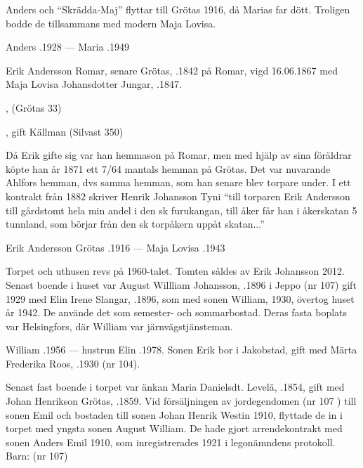 Anders och ``Skrädda-Maj'' flyttar till Grötas 1916, då Marias far dött. Troligen bodde de tillsammans med modern Maja Lovisa.

Anders .1928  ---  Maria .1949


Erik Andersson Romar, senare Grötas, .1842 på Romar, vigd 16.06.1867 med Maja Lovisa Johansdotter Jungar, .1847.
\begin{jhchildren}
  \item {}, (Grötas 33)
  \item {}
  \item {}, gift Källman (Silvast 350)
\end{jhchildren}

Då Erik gifte sig var han hemmason på Romar, men med hjälp av sina föräldrar köpte han år 1871 ett 7/64 mantals hemman på Grötas. Det var nuvarande Ahlfors hemman, dvs samma hemman, som han senare blev torpare under. I ett kontrakt från 1882 skriver Henrik Johansson Tyni ``till torparen Erik Andersson till gårdstomt hela min andel i den sk furukangan, till åker får han i åkerskatan 5 tunnland, som börjar från den sk torpåkern uppåt skatan...''

Erik Andersson Grötas .1916  ---  Maja Lovisa .1943






Torpet och uthusen revs på 1960-talet. Tomten såldes av Erik Johansson 2012. Senast boende i huset var August Willliam Johansson, .1896 i Jeppo (nr 107) gift 1929 med Elin Irene Slangar, .1896, som med sonen William,  1930, övertog huset år 1942. De använde det som semester- och sommarbostad. Deras fasta boplats var Helsingfors, där William var järnvägstjänsteman.

William .1956  ---  hustrun Elin .1978.
Sonen Erik bor i Jakobstad, gift med Märta Frederika Roos, .1930 (nr 104).


Senast fast boende i torpet var änkan Maria Danielsdt. Levelä, .1854, gift med Johan Henrikson Grötas, .1859. Vid försäljningen av jordegendomen (nr 107 ) till sonen Emil och bostaden till sonen Johan Henrik Westin 1910, flyttade de in i torpet med yngsta sonen August William. De hade gjort arrendekontrakt med sonen Anders Emil 1910, som inregistrerades 1921 i legonämndens protokoll.  Barn: (nr 107)

